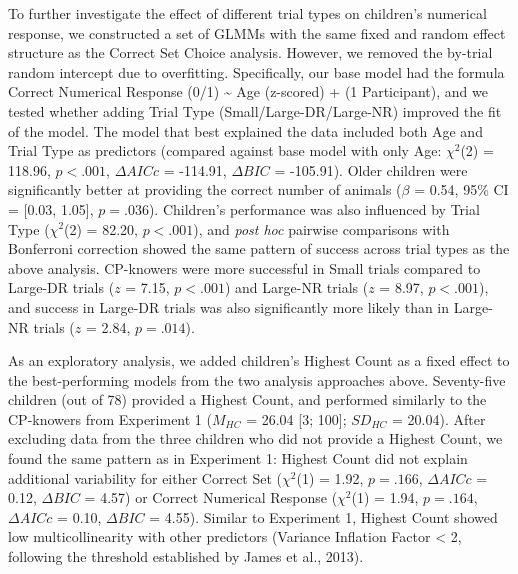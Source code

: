 \documentclass[
  man,floatsintext]{apa7}
\begin{document}
To further investigate the effect of different trial types on children's numerical response, we constructed a set of GLMMs with the same fixed and random effect structure as the Correct Set Choice analysis. However, we removed the by-trial random intercept due to overfitting. Specifically, our base model had the formula Correct Numerical Response (0/1) \textasciitilde{} Age (z-scored) + (1 \textbar{} Participant), and we tested whether adding Trial Type (Small/Large-DR/Large-NR) improved the fit of the model. The model that best explained the data included both Age and Trial Type as predictors (compared against base model with only Age: \(\chi^2\)(2) = 118.96, \(p < .001\), \(\Delta AICc\) = -114.91, \(\Delta BIC\) = -105.91). Older children were significantly better at providing the correct number of animals (\(\beta\) = 0.54, 95\% CI = {[}0.03, 1.05{]}, \(p = .036\)). Children's performance was also influenced by Trial Type (\(\chi^2\)(2) = 82.20, \(p < .001\)), and \emph{post hoc} pairwise comparisons with Bonferroni correction showed the same pattern of success across trial types as the above analysis. CP-knowers were more successful in Small trials compared to Large-DR trials (\(z\) = 7.15, \(p < .001\)) and Large-NR trials (\(z\) = 8.97, \(p < .001\)), and success in Large-DR trials was also significantly more likely than in Large-NR trials (\(z\) = 2.84, \(p = .014\)).

As an exploratory analysis, we added children's Highest Count as a fixed effect to the best-performing models from the two analysis approaches above. Seventy-five children (out of 78) provided a Highest Count, and performed similarly to the CP-knowers from Experiment 1 (\(M_{HC}\) = 26.04 {[}3; 100{]}; \(SD_{HC}\) = 20.04). After excluding data from the three children who did not provide a Highest Count, we found the same pattern as in Experiment 1: Highest Count did not explain additional variability for either Correct Set (\(\chi^2\)(1) = 1.92, \(p = .166\), \(\Delta AICc\) = 0.12, \(\Delta BIC\) = 4.57) or Correct Numerical Response (\(\chi^2\)(1) = 1.94, \(p = .164\), \(\Delta AICc\) = 0.10, \(\Delta BIC\) = 4.55). Similar to Experiment 1, Highest Count showed low multicollinearity with other predictors (Variance Inflation Factor \textless{} 2, following the threshold established by James et al., 2013).
\end{document}
